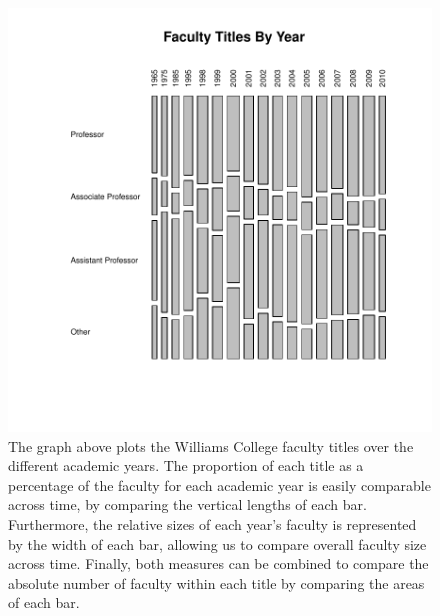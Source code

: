 \documentclass[a4paper]{report}
\begin{document}
\begin{article}
\begin{figure}
  \centering
  \vspace*{.1in}
\includegraphics{faculty-005}

\caption{
The graph above plots the Williams College faculty titles over the
different academic years. The proportion of each title as a percentage
of the faculty for each academic year is easily comparable across
time, by comparing the vertical lengths of each bar. Furthermore, the
relative sizes of each year's faculty is represented by the width of
each bar, allowing us to compare overall faculty size across
time. Finally, both measures can be combined to compare the absolute
number of faculty within each title by comparing the areas of each bar.
}
\end{figure}

\end{article}
\end{document}

